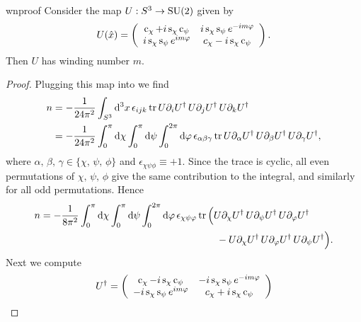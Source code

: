 \begin{proposition}{}{wnproof}
Consider the map $U:S^3\to\operatorname{SU}(2)$ given by
$$
U(\hat{x})=\left(\begin{array}{cc}
             \operatorname{c}_\chi+i\operatorname{s}_\chi\operatorname{c}_\psi     & i\operatorname{s}_\chi\operatorname{s}_\psi e^{-im\varphi}\\
             i\operatorname{s}_\chi\operatorname{s}_\psi e^{im\varphi}& c_\chi-i\operatorname{s}_\chi\operatorname{c}_\psi 
            \end{array}\right).
$$
Then $U$ has winding number $m$.
\begin{proof}
  Plugging this map into  we find
  \begin{equation*}
  \begin{aligned}
    n&=-\frac{1}{24\pi^2}\int_{S^3} \dd[3]{x}\epsilon_{ijk}\tr
        U\partial_i U^\dagger\,U\partial_j U^\dagger\,U\partial_k U^\dagger\\
   &=-\frac{1}{24\pi^2}\int_0^\pi\dd\chi\int_0^\pi\dd{\psi}\int_0^{2\pi}
        \dd{\varphi}\epsilon_{\alpha\beta\gamma}\tr
        U\partial_\alpha U^\dagger\,U\partial_\beta U^\dagger\,
        U\partial_\gamma U^\dagger,\\
  \end{aligned}
  \end{equation*}
  where $\alpha,\,\beta,\,\gamma\in\{\chi,\,\psi,\,\phi\}$ and
  $\epsilon_{\chi\psi\phi}\equiv+1$.
  Since the trace is cyclic, all even permutations of $\chi,\,\psi,\,\phi$ give
  the same contribution to the integral, and similarly for all odd
  permutations. Hence
  \begin{equation*}\begin{aligned}
    n=-\frac{1}{8\pi^2}\int_0^\pi\dd{\chi}\int_0^\pi\dd\psi\int_0^{2\pi}
        \dd{\varphi}\epsilon_{\chi\psi\varphi}&\tr\Big(
        U\partial_\chi U^\dagger\,U\partial_\psi U^\dagger\,
        U\partial_\varphi U^\dagger\\
        &~~~~~~-U\partial_\chi U^\dagger\,U\partial_\varphi U^\dagger\,
        U\partial_\psi U^\dagger\Big).
  \end{aligned}\end{equation*}
  Next we compute
  \begin{equation*}
  \begin{aligned}
    U^\dagger&=\left(\begin{array}{cc}
                  \co_\chi-i\s_\chi\co_\psi & -i\s_\chi\s_\psi e^{-im\phi}\\
                 -i\s_\chi\s_\psi e^{im\phi}& c_\chi+i\s_\chi\co_\psi 
                \end{array}\right)\\

\end{aligned}
\end{equation*}
\end{proof}
\end{proposition}
